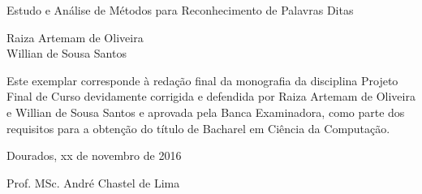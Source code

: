 \thispagestyle{empty}
\begin{center}

\Large{Estudo e Análise de Métodos para Reconhecimento de Palavras Ditas}

\vspace*{4cm}

\large{Raiza Artemam de Oliveira \\ Willian de Sousa Santos }

\vspace*{4cm}

\end{center}
\begin{flushright}
\begin{minipage}{0.5\textwidth}
\normalsize{
Este exemplar corresponde à redação final
da monografia da disciplina Projeto Final de Curso 
devidamente corrigida e defendida por
 Raiza Artemam de Oliveira e Willian de Sousa Santos
e aprovada pela Banca Examinadora, 
como parte dos requisitos para a obtenção
do título de Bacharel em Ciência da Computação.

\vspace*{2cm}

Dourados, xx de novembro de 2016

\vspace*{2cm}

Prof. MSc. André Chastel de Lima
}
\end{minipage}
\end{flushright}



